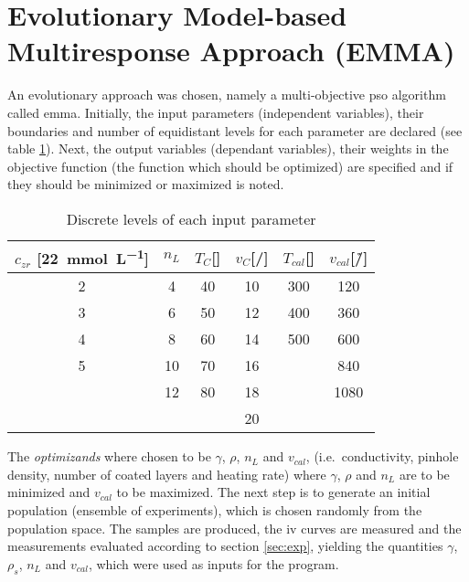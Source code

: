 \section{Evolutionary Model-based Multiresponse Approach (EMMA)}
\label{sec:ss}
An evolutionary approach was chosen, namely a multi-objective 
\gls{pso} algorithm called \gls{emma}\cite{villanova2010function,Kennedy1995,Breiman1997,Carta2011}.
%
%
Initially, the input parameters (independent variables), their boundaries and number of equidistant levels for each parameter are declared (see table \ref{tab:input}).
Next, the output variables (dependant variables), their weights in the objective function (the function which should be optimized) are specified and if they should be minimized or maximized is noted.
%
\begin{table}[htb]
	\centering
	\begin{tabular}{cc cc cc}
		\hline\hline
        $c_{zr}$ [\SI{22}{\milli\mol\per\liter}]	&$n_L$	&$T_{C}$[\oc{}]	&$v_{C}$[\mm{}/\s{}]	&$T_{cal}$[\oc{}]	&$v_{cal}$[\oc{}/\h{}]	\\
		\hline
		2				&4		&40					&10				&300				&120	\\
		3				&6		&50					&12				&400				&360	\\
		4				&8		&60					&14				&500				&600	\\
		5				&10		&70					&16				&					&840	\\
						&12		&80					&18				&					&1080	\\
						&		&					&20				&					&		\\
		\hline\hline
	\end{tabular}
	\caption{Discrete levels of each input parameter }
	\label{tab:input}
\end{table}

The \textit{optimizands} where chosen to be $\gamma$, $\rho$, $n_L$ and $v_{cal}$, 
(i.e.\ conductivity, pinhole density, number of coated layers and heating rate)
where $\gamma$, $\rho$ and $n_L$ are to be minimized and $v_{cal}$ to be maximized.
The next step is to generate an initial population (ensemble of experiments), which is chosen randomly from the population space. 
The samples are produced, the \gls{iv} curves are measured and the measurements evaluated according to section 
\ref{sec:exp}, yielding the quantities 
$\gamma$, $\rho_s$, $n_L$ and $v_{cal}$, which were used as inputs for the program.

